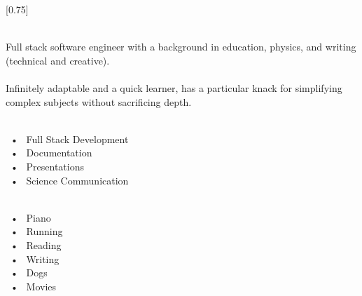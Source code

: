 \documentclass[lighthipster]{simplehipstercv}
\begin{document}
\setlength{\columnsep}{1.5cm}
[0.75]
\begin{paracol}{2}

\paracolbackgroundoptions



\footnotesize
{\setasidefontcolour
\begin{center}
\end{center}
\bigskip
\bigskip
{}\\[0.5em]

Full stack software engineer with a background in education, physics, and writing (technical and creative).\\\\Infinitely adaptable and a quick learner, has a particular knack for simplifying complex subjects without sacrificing depth.

\bigskip

 \\[0.5em]
~•~ Full Stack Development\\~•~ Documentation\\~•~ Presentations\\~•~ Science Communication

\bigskip

\\[0.5em]
~•~ Piano\\~•~ Running\\~•~ Reading \\~•~ Writing\\~•~ Dogs\\~•~ Movies

\vspace{4em}

\\


\phantom{turn the page}

\phantom{turn the page}
}
\switchcolumn


\end{paracol}
\end{document}
